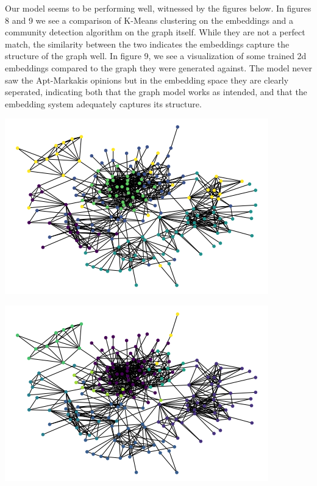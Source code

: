 \documentclass[10pt]{article}
\begin{document}
Our model seems to be performing well, witnessed by the figures below. In figures 8 and 9 we see a comparison of K-Means clustering on the embeddings and a community detection algorithm on the graph itself. While they are not a perfect match, the similarity between the two indicates the embeddings capture the structure of the graph well. In figure 9, we see a visualization of some trained 2d embeddings compared to the graph they were generated against. The model never saw the Apt-Markakis opinions but in the embedding space they are clearly seperated, indicating both that the graph model works as intended, and that the embedding system adequately captures its structure. \\

\begin{center}
\begin{minipage}{0.48\linewidth}
\includegraphics[width=\linewidth]{images/kmeans.png}
\end{minipage}%
\hfill
\begin{minipage}{0.49\linewidth}
\includegraphics[width=\linewidth]{images/communities.png}
\end{minipage}
\end{center}
\end{document}
